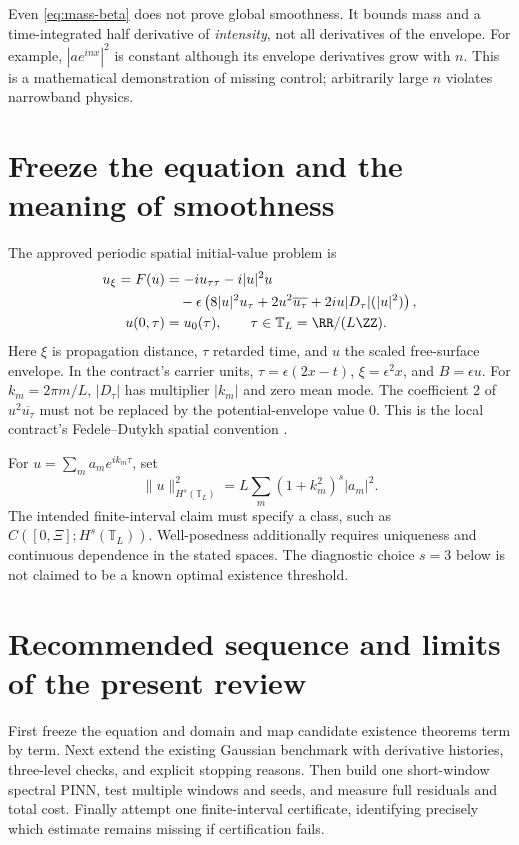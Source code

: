 \documentclass[11pt]{article}
\newcommand{\D}{\lvert D_\tau\rvert}
\newcommand{\TT}{\mathbb T_L}
\newcommand{\norm}[1]{\lVert #1\rVert}
\begin{document}
Even \eqref{eq:mass-beta} does not prove global smoothness. It bounds
mass and a time-integrated half derivative of \emph{intensity},
not all derivatives of the envelope. For example, \(|a e^{inx}|^2\)
is constant although its envelope derivatives grow with \(n\).
This is a mathematical demonstration of missing control; arbitrarily
large \(n\) violates narrowband physics.

\section{Freeze the equation and the meaning of smoothness}
The approved periodic spatial initial-value problem is
\begin{align}
 u_\xi=F(u)&=-iu_{\tau\tau}-i|u|^2u \notag\\
 &\quad-\epsilon\left(8|u|^2u_\tau+
 2u^2\overline{u_\tau}+2iu\D(|u|^2)\right),\label{eq:baseline}\\
 u(0,\tau)&=u_0(\tau),\qquad \tau\in\TT=\RR/(L\ZZ).
 \label{eq:initial}
\end{align}
Here \(\xi\) is propagation distance, \(\tau\) retarded time,
and \(u\) the scaled free-surface envelope. In the contract's
carrier units, \(\tau=\epsilon(2x-t)\), \(\xi=\epsilon^2x\),
and \(B=\epsilon u\).
For \(k_m=2\pi m/L\), \(\D\) has multiplier \(|k_m|\)
and zero mean mode. The coefficient 2 of
\(u^2\overline{u_\tau}\) must not be replaced by the
potential-envelope value 0.
This is the local contract's Fedele--Dutykh spatial convention
\cite{fedele}.

For \(u=\sum_m a_m e^{ik_m\tau}\), set
\[
 \norm{u}_{H^s(\TT)}^2=L\sum_m(1+k_m^2)^s|a_m|^2.
\]
The intended finite-interval claim must specify a class, such as
\(C([0,\Xi];H^s(\TT))\). Well-posedness additionally requires
uniqueness and continuous dependence in the stated spaces.
The diagnostic choice \(s=3\) below is not claimed to be a
known optimal existence threshold.




\section{Recommended sequence and limits of the present review}
First freeze the equation and domain and map candidate existence
theorems term by term. Next extend the existing Gaussian benchmark
with derivative histories, three-level checks, and explicit stopping
reasons. Then build one short-window spectral PINN, test multiple
windows and seeds, and measure full residuals and total cost.
Finally attempt one finite-interval certificate, identifying precisely
which estimate remains missing if certification fails.
\end{document}
